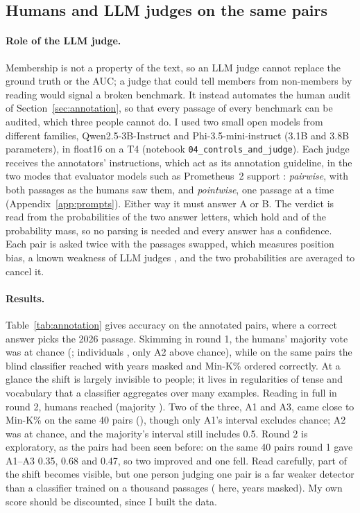 \documentclass[11pt]{article}
\begin{document}
\subsection{Humans and LLM judges on the same pairs}
\label{sec:judges}

\paragraph{Role of the LLM judge.} Membership is not a property of the text, so an LLM judge cannot replace the ground truth or the AUC; a judge that could tell members from non-members by reading would signal a broken benchmark. It instead automates the human audit of Section~\ref{sec:annotation}, so that every passage of every benchmark can be audited, which three people cannot do. I used two small open models from different families, Qwen2.5-3B-Instruct \citep{qwen2024qwen25} and Phi-3.5-mini-instruct \citep{abdin2024phi3} (3.1B and 3.8B parameters), in float16 on a T4 (notebook \texttt{04\_controls\_and\_judge}). Each judge receives the annotators' instructions, which act as its annotation guideline, in the two modes that evaluator models such as Prometheus~2 support \citep{kim2024prometheus}: \emph{pairwise}, with both passages as the humans saw them, and \emph{pointwise}, one passage at a time (Appendix~\ref{app:prompts}). Either way it must answer A or B. The verdict is read from the probabilities of the two answer letters, which hold \JudgeQwenMass{} and \JudgePhiMass{} of the probability mass, so no parsing is needed and every answer has a confidence. Each pair is asked twice with the passages swapped, which measures position bias, a known weakness of LLM judges \citep{zheng2023judging}, and the two probabilities are averaged to cancel it.

\paragraph{Results.} Table~\ref{tab:annotation} gives accuracy on the annotated pairs, where a correct answer picks the 2026 passage. Skimming in round 1, the humans' majority vote was at chance (\MajorityAccOne{}; individuals \HumanAccRangeOne{}, only A2 above chance), while on the same pairs the blind classifier reached \PairBlindNoyrOne{} with years masked and Min-K\% ordered \PairMinKOne{} correctly. At a glance the shift is largely invisible to people; it lives in regularities of tense and vocabulary that a classifier aggregates over many examples. Reading in full in round 2, humans reached \HumanAccRangeTwo{} (majority \MajorityAccTwo{}). Two of the three, A1 and A3, came close to Min-K\% on the same 40 pairs (\PairMinKTwo{}), though only A1's interval excludes chance; A2 was at chance, and the majority's interval still includes 0.5. Round 2 is exploratory, as the pairs had been seen before: on the same 40 pairs round 1 gave A1--A3 0.35, 0.68 and 0.47, so two improved and one fell. Read carefully, part of the shift becomes visible, but one person judging one pair is a far weaker detector than a classifier trained on a thousand passages (\PairBlindNoyrTwo{} here, years masked). My own score should be discounted, since I built the data.
\end{document}
